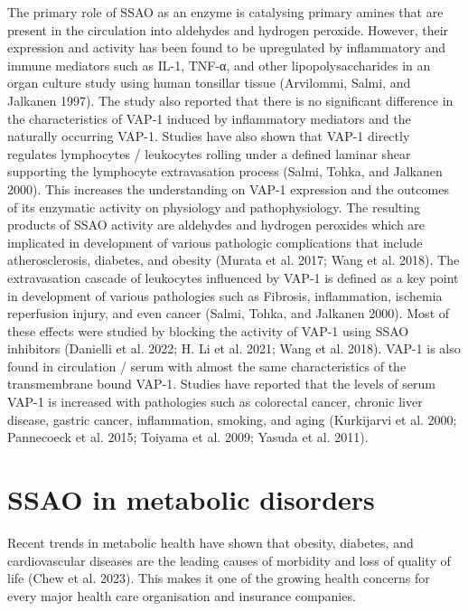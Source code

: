 \documentclass[
  letterpaper,
  DIV=11,
  numbers=noendperiod]{scrreprt}
\begin{document}
The primary role of SSAO as an enzyme is catalysing primary amines that
are present in the circulation into aldehydes and hydrogen peroxide.
However, their expression and activity has been found to be upregulated
by inflammatory and immune mediators such as IL-1, TNF-α, and other
lipopolysaccharides in an organ culture study using human tonsillar
tissue (Arvilommi, Salmi, and Jalkanen 1997). The study also reported
that there is no significant difference in the characteristics of VAP-1
induced by inflammatory mediators and the naturally occurring VAP-1.
Studies have also shown that VAP-1 directly regulates lymphocytes /
leukocytes rolling under a defined laminar shear supporting the
lymphocyte extravasation process (Salmi, Tohka, and Jalkanen 2000). This
increases the understanding on VAP-1 expression and the outcomes of its
enzymatic activity on physiology and pathophysiology. The resulting
products of SSAO activity are aldehydes and hydrogen peroxides which are
implicated in development of various pathologic complications that
include atherosclerosis, diabetes, and obesity (Murata et al. 2017; Wang
et al. 2018). The extravasation cascade of leukocytes influenced by
VAP-1 is defined as a key point in development of various pathologies
such as Fibrosis, inflammation, ischemia reperfusion injury, and even
cancer (Salmi, Tohka, and Jalkanen 2000). Most of these effects were
studied by blocking the activity of VAP-1 using SSAO inhibitors
(Danielli et al. 2022; H. Li et al. 2021; Wang et al. 2018). VAP-1 is
also found in circulation / serum with almost the same characteristics
of the transmembrane bound VAP-1. Studies have reported that the levels
of serum VAP-1 is increased with pathologies such as colorectal cancer,
chronic liver disease, gastric cancer, inflammation, smoking, and aging
(Kurkijarvi et al. 2000; Pannecoeck et al. 2015; Toiyama et al. 2009;
Yasuda et al. 2011).

\section{\texorpdfstring{\textbf{SSAO in metabolic
disorders}}{SSAO in metabolic disorders}}\label{ssao-in-metabolic-disorders}

Recent trends in metabolic health have shown that obesity, diabetes, and
cardiovascular diseases are the leading causes of morbidity and loss of
quality of life (Chew et al. 2023). This makes it one of the growing
health concerns for every major health care organisation and insurance
companies.
\end{document}
